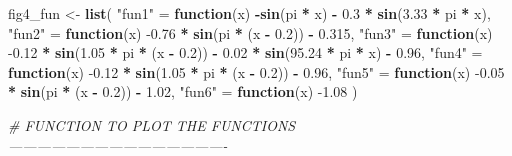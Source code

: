 \documentclass[11pt,]{article}
\newenvironment{Shaded}{\begin{snugshade}}{\end{snugshade}}
\newcommand{\CommentTok}[1]{\textcolor[rgb]{0.56,0.35,0.01}{\textit{#1}}}
\newcommand{\ControlFlowTok}[1]{\textcolor[rgb]{0.13,0.29,0.53}{\textbf{#1}}}
\newcommand{\FloatTok}[1]{\textcolor[rgb]{0.00,0.00,0.81}{#1}}
\newcommand{\KeywordTok}[1]{\textcolor[rgb]{0.13,0.29,0.53}{\textbf{#1}}}
\newcommand{\NormalTok}[1]{#1}
\newcommand{\OperatorTok}[1]{\textcolor[rgb]{0.81,0.36,0.00}{\textbf{#1}}}
\newcommand{\StringTok}[1]{\textcolor[rgb]{0.31,0.60,0.02}{#1}}
\begin{document}
\begin{Shaded}
\begin{Highlighting}[]
{{\NormalTok{fig4_fun <-}\StringTok{ }\KeywordTok{list}\NormalTok{(}
  \StringTok{"fun1"}\NormalTok{ =}\StringTok{ }\ControlFlowTok{function}\NormalTok{(x) }\OperatorTok{-}\KeywordTok{sin}\NormalTok{(pi }\OperatorTok{*}\StringTok{ }\NormalTok{x) }\OperatorTok{-}\StringTok{ }\FloatTok{0.3} \OperatorTok{*}\StringTok{ }\KeywordTok{sin}\NormalTok{(}\FloatTok{3.33} \OperatorTok{*}\StringTok{ }\NormalTok{pi }\OperatorTok{*}\StringTok{ }\NormalTok{x),}
  \StringTok{"fun2"}\NormalTok{ =}\StringTok{ }\ControlFlowTok{function}\NormalTok{(x) }\FloatTok{-0.76} \OperatorTok{*}\StringTok{ }\KeywordTok{sin}\NormalTok{(pi }\OperatorTok{*}\StringTok{ }\NormalTok{(x }\OperatorTok{-}\StringTok{ }\FloatTok{0.2}\NormalTok{)) }\OperatorTok{-}\StringTok{ }\FloatTok{0.315}\NormalTok{,}
  \StringTok{"fun3"}\NormalTok{ =}\StringTok{ }\ControlFlowTok{function}\NormalTok{(x) }\FloatTok{-0.12} \OperatorTok{*}\StringTok{ }\KeywordTok{sin}\NormalTok{(}\FloatTok{1.05} \OperatorTok{*}\StringTok{ }\NormalTok{pi }\OperatorTok{*}\StringTok{ }\NormalTok{(x }\OperatorTok{-}\StringTok{ }\FloatTok{0.2}\NormalTok{)) }\OperatorTok{-}\StringTok{ }
\StringTok{    }\FloatTok{0.02} \OperatorTok{*}\StringTok{ }\KeywordTok{sin}\NormalTok{(}\FloatTok{95.24} \OperatorTok{*}\StringTok{ }\NormalTok{pi }\OperatorTok{*}\StringTok{ }\NormalTok{x) }\OperatorTok{-}\StringTok{ }\FloatTok{0.96}\NormalTok{,}
  \StringTok{"fun4"}\NormalTok{ =}\StringTok{ }\ControlFlowTok{function}\NormalTok{(x) }\FloatTok{-0.12} \OperatorTok{*}\StringTok{ }\KeywordTok{sin}\NormalTok{(}\FloatTok{1.05} \OperatorTok{*}\StringTok{ }\NormalTok{pi }\OperatorTok{*}\StringTok{ }\NormalTok{(x }\OperatorTok{-}\StringTok{ }\FloatTok{0.2}\NormalTok{)) }\OperatorTok{-}\StringTok{ }\FloatTok{0.96}\NormalTok{,}
  \StringTok{"fun5"}\NormalTok{ =}\StringTok{ }\ControlFlowTok{function}\NormalTok{(x) }\FloatTok{-0.05} \OperatorTok{*}\StringTok{ }\KeywordTok{sin}\NormalTok{(pi }\OperatorTok{*}\StringTok{ }\NormalTok{(x }\OperatorTok{-}\StringTok{ }\FloatTok{0.2}\NormalTok{)) }\OperatorTok{-}\StringTok{ }\FloatTok{1.02}\NormalTok{,}
  \StringTok{"fun6"}\NormalTok{ =}\StringTok{ }\ControlFlowTok{function}\NormalTok{(x) }\FloatTok{-1.08}
\NormalTok{)}

\CommentTok{# FUNCTION TO PLOT THE FUNCTIONS ----------------------------------------------}

}}
\end{Highlighting}
\end{Shaded}
\end{document}
